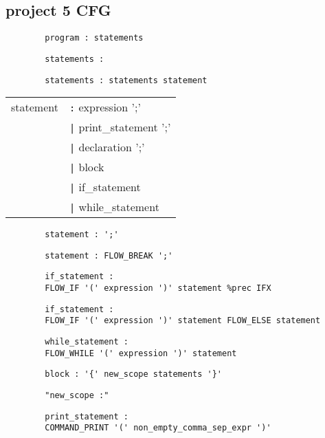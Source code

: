 \documentclass[10pt,landscape]{article}
\begin{document}
\begin{multicols}{3}
		\subsection{project 5 CFG}
		\begin{verbatim}
		program : statements
		\end{verbatim}
		\begin{verbatim}
		statements :
		\end{verbatim}
		\begin{verbatim}
		statements : statements statement
		\end{verbatim}
		\begin{tabular}{ll}
		statement 	&\verb!:! expression ';' \\
			&\verb!|! print\_statement ';'\\
			&\verb!|! declaration ';'\\
			&\verb!|! block\\
			&\verb!|! if\_statement\\
			&\verb!|! while\_statement\\
		\end{tabular}
		\begin{verbatim}
		statement : ';'
		\end{verbatim}
		\begin{verbatim}
		statement : FLOW_BREAK ';'
		\end{verbatim}
		\begin{verbatim}
		if_statement : 
		FLOW_IF '(' expression ')' statement %prec IFX
		\end{verbatim}
		\begin{verbatim}
		if_statement : 
		FLOW_IF '(' expression ')' statement FLOW_ELSE statement
		\end{verbatim}
		\begin{verbatim}
		while_statement : 
		FLOW_WHILE '(' expression ')' statement
		\end{verbatim}
		\begin{verbatim}
		block : '{' new_scope statements '}'
		\end{verbatim}
		\begin{verbatim}
		"new_scope :"
		\end{verbatim}
		\begin{verbatim}
		print_statement : 
		COMMAND_PRINT '(' non_empty_comma_sep_expr ')'
		\end{verbatim}
		\begin{verbatim}

\end{verbatim}
\end{multicols}
\end{document}

